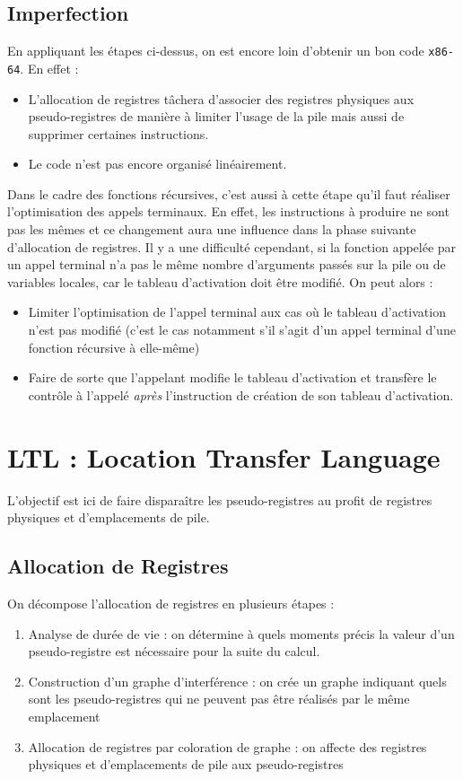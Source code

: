 \documentclass{cours}
\begin{document}
\subsection{Imperfection}
En appliquant les étapes ci-dessus, on est encore loin d'obtenir un bon code \texttt{x86-64}. En effet :
\begin{itemize}
    \item L'allocation de registres tâchera d'associer des registres physiques aux pseudo-registres de manière à limiter l'usage de la pile mais aussi de supprimer certaines instructions.
    \item Le code n'est pas encore organisé linéairement.
\end{itemize}
Dans le cadre des fonctions récursives, c'est aussi à cette étape qu'il faut réaliser l'optimisation des appels terminaux. En effet, les instructions à produire ne sont pas les mêmes et ce changement aura une influence dans la phase suivante d'allocation de registres. Il y a une difficulté cependant, si la fonction appelée par un appel terminal n'a pas le même nombre d'arguments passés sur la pile ou de variables locales, car le tableau d'activation doit être modifié. On peut alors :
\begin{itemize}
    \item Limiter l'optimisation de l'appel terminal aux cas où le tableau d'activation n'est pas modifié (c'est le cas notamment s'il s'agit d'un appel terminal d'une fonction récursive à elle-même)
    \item Faire de sorte que l'appelant modifie le tableau d'activation et transfère le contrôle à l'appelé \emph{après} l'instruction de création de son tableau d'activation.
\end{itemize}

\section{LTL : Location Transfer Language}
L'objectif est ici de faire disparaître les pseudo-registres au profit de registres physiques et d'emplacements de pile.
\subsection{Allocation de Registres}
On décompose l'allocation de registres en plusieurs étapes :
\begin{enumerate}
    \item Analyse de durée de vie : on détermine à quels moments précis la valeur d'un pseudo-registre est nécessaire pour la suite du calcul.
    \item Construction d'un graphe d'interférence : on crée un graphe indiquant quels sont les pseudo-registres qui ne peuvent pas être réalisés par le même emplacement
    \item Allocation de registres par coloration de graphe : on affecte des registres physiques et d'emplacements de pile aux pseudo-registres
\end{enumerate}
\end{document}
